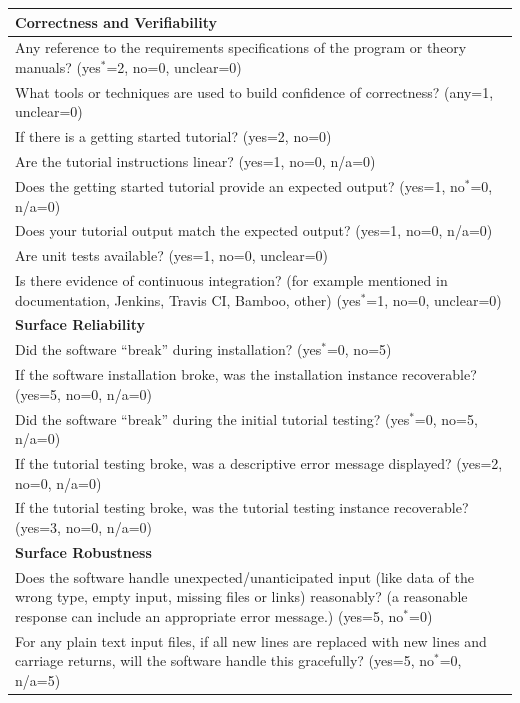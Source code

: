 \documentclass[letterpaper,cleveref]{lipics-v2019}
\begin{document}
\def\arraystretch{1.33}
\begin{tabular}{p{14cm}}
	\hline		
	\textbf{Correctness and Verifiability}\\
	\hline
	Any reference to the requirements specifications of the program or theory
	manuals? ({yes$^*$=2, no=0, unclear=0})\\
	What tools or techniques are used to build confidence of correctness? (any=1,
	unclear=0)\\
	If there is a getting started tutorial? ({yes=2, no=0})\\
	Are the tutorial instructions linear? ({yes=1, no=0, n/a=0})\\
	Does the getting started tutorial provide an expected output? ({yes=1, no$^*$=0,
	n/a=0})\\
	Does your tutorial output match the expected output? ({yes=1, no=0, n/a=0})\\
	Are unit tests available?  ({yes=1, no=0, unclear=0})\\
	Is there evidence of continuous integration? (for example mentioned in
	documentation, Jenkins, Travis CI, Bamboo, other) ({yes$^*$=1, no=0,
	unclear=0})\\
	\hline	
	\textbf{Surface Reliability}\\
	\hline
	Did the software “break” during installation? ({yes$^*$=0, no=5})\\
	If the software installation broke, was the installation instance recoverable?
	({yes=5, no=0, n/a=0})\\
	Did the software “break” during the initial tutorial testing? ({yes$^*$=0, no=5,
	n/a=0})\\
	If the tutorial testing broke, was a descriptive error message displayed?
	({yes=2, no=0, n/a=0})\\
	If the tutorial testing broke, was the tutorial testing instance recoverable?
	({yes=3, no=0, n/a=0})\\
	\hline		
	\textbf{Surface Robustness}\\
	\hline
	Does the software handle unexpected/unanticipated input (like data of the
	wrong type, empty input, missing files or links) reasonably? (a reasonable
	response can include an appropriate error message.) ({yes=5, no$^*$=0})\\
	For any plain text input files, if all new lines are replaced with new lines
	and carriage returns, will the software handle this gracefully? ({yes=5,
	no$^*$=0, n/a=5})\\
	\hline		
\end{tabular}
\end{document}
